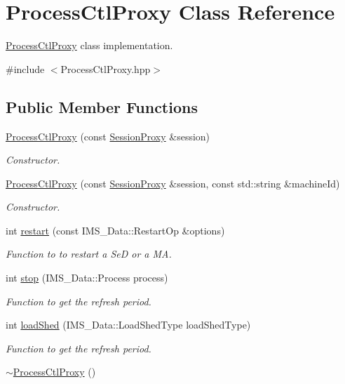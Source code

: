\hypertarget{classProcessCtlProxy}{
\section{ProcessCtlProxy Class Reference}
\label{classProcessCtlProxy}
}


\hyperlink{classProcessCtlProxy}{ProcessCtlProxy} class implementation.  




{\ttfamily \#include $<$ProcessCtlProxy.hpp$>$}

\subsection*{Public Member Functions}
\begin{DoxyCompactItemize}
\item 
\hyperlink{classProcessCtlProxy_a726d138d35f547346f473108a39db1cd}{ProcessCtlProxy} (const \hyperlink{classSessionProxy}{SessionProxy} \&session)
\begin{DoxyCompactList}\small\item\em Constructor. \item\end{DoxyCompactList}\item 
\hyperlink{classProcessCtlProxy_ab74b057a3798343c8b9949eb1c44a095}{ProcessCtlProxy} (const \hyperlink{classSessionProxy}{SessionProxy} \&session, const std::string \&machineId)
\begin{DoxyCompactList}\small\item\em Constructor. \item\end{DoxyCompactList}\item 
int \hyperlink{classProcessCtlProxy_a817d9c7c6e578c490fb743e0958882ad}{restart} (const IMS\_\-Data::RestartOp \&options)
\begin{DoxyCompactList}\small\item\em Function to to restart a SeD or a MA. \item\end{DoxyCompactList}\item 
int \hyperlink{classProcessCtlProxy_af11106aa5267bf0d97a9fa9bb30b2272}{stop} (IMS\_\-Data::Process process)
\begin{DoxyCompactList}\small\item\em Function to get the refresh period. \item\end{DoxyCompactList}\item 
int \hyperlink{classProcessCtlProxy_a389d2701b7cad8691b21d800c47588c5}{loadShed} (IMS\_\-Data::LoadShedType loadShedType)
\begin{DoxyCompactList}\small\item\em Function to get the refresh period. \item\end{DoxyCompactList}\item 
\hypertarget{classProcessCtlProxy_a6b2c7409567c7b4662bedab034cc2f17}{
\hyperlink{classProcessCtlProxy_a6b2c7409567c7b4662bedab034cc2f17}{$\sim$ProcessCtlProxy} ()}
\label{classProcessCtlProxy_a6b2c7409567c7b4662bedab034cc2f17}


\end{DoxyCompactItemize}
